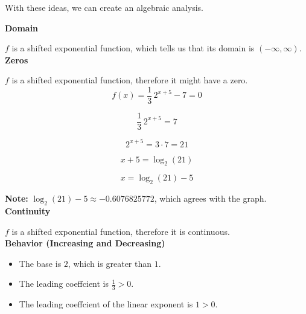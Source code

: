 \documentclass{ximera}
\begin{document}
\begin{example}
\begin{idea}
\begin{image}
\end{image}


With these ideas, we can create an algebraic analysis.

\end{idea}




\textbf{Domain}

$f$ is a shifted exponential function, which tells us that its domain is $(-\infty, \infty)$. \\


\textbf{Zeros}

$f$ is a shifted exponential function, therefore it might have a zero. \\




\[ f(x) = \frac{1}{3} \, 2^{x+5} - 7 = 0 \]


\[ \frac{1}{3} \, 2^{x+5}  = 7 \]

\[ 2^{x+5}  = 3 \cdot 7 = 21 \]

\[ x+5 = \log_2(21) \]

\[ x = \log_2(21) - 5 \]


\textbf{Note:} $\log_2(21) - 5 \approx -0.6076825772$, which agrees with the graph. \\





\textbf{Continuity}

$f$ is a shifted exponential function, therefore it is continuous. \\




\textbf{Behavior (Increasing and Decreasing)}


\begin{itemize}
\item The base is $2$, which is greater than $1$.
\item The leading coeffcient is $\frac{1}{3} > 0$.
\item The leading coeffcient of the linear exponent is $1 > 0$.
\end{itemize}


\end{example}
\end{document}
